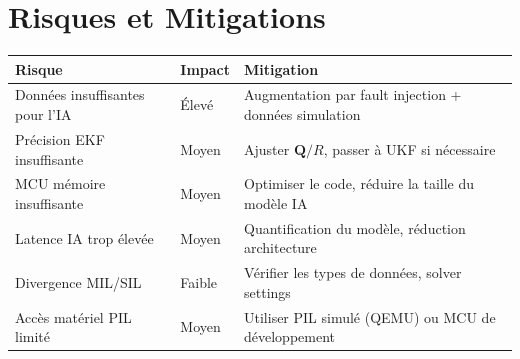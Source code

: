 \documentclass[a4paper,12pt]{article}
\begin{document}
\section{Risques et Mitigations}

\begin{center}
\small
\begin{tabular}{p{4cm}p{2cm}p{6cm}}
\toprule
\textbf{Risque} & \textbf{Impact} & \textbf{Mitigation} \\
\midrule
Données insuffisantes pour l'IA & Élevé & Augmentation par fault injection + données simulation \\
Précision EKF insuffisante & Moyen & Ajuster $\mathbf{Q}/R$, passer à UKF si nécessaire \\
MCU mémoire insuffisante & Moyen & Optimiser le code, réduire la taille du modèle IA \\
Latence IA trop élevée & Moyen & Quantification du modèle, réduction architecture \\
Divergence MIL/SIL & Faible & Vérifier les types de données, solver settings \\
Accès matériel PIL limité & Moyen & Utiliser PIL simulé (QEMU) ou MCU de développement \\
\bottomrule
\end{tabular}
\end{center}
\end{document}
